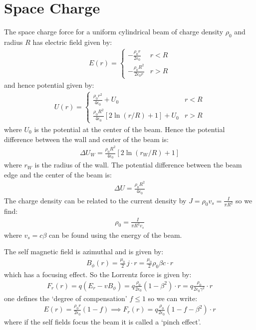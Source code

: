 \documentclass{article}
\numberwithin{equation}{section}
\begin{document}
\section{Space Charge}

The space charge force for a uniform cylindrical beam of charge density $\rho_0$ and radius $R$ has electric field given by:
\begin{align}
E(r) = \begin{cases}
-\frac{\rho_0 r}{2 \epsilon_0} & r<R \\
-\frac{\rho_0 R^2}{2 \epsilon_0 r} & r>R
\end{cases}
\end{align}
and hence potential given by:
\begin{align}
U(r) = \begin{cases}
\frac{\rho_0 r^2}{4 \epsilon_0} + U_0 & r<R \\
\frac{\rho_0 R^2}{4 \epsilon_0 } \left[ 2 \ln(r/R)+1 \right] + U_0 & r>R
\end{cases}
\end{align}
where $U_0$ is the potential at the center of the beam. Hence the potential difference between the wall and center of the beam is:
\begin{align}
\Delta U_W = \frac{\rho_0 R^2}{4 \epsilon_0 } \left[ 2 \ln(r_W/R)+1 \right] 
\end{align}
where $r_W$ is the radius of the wall. The potential difference between the beam edge and the center of the beam is:
\begin{align}
\Delta U = \frac{\rho_0 R^2}{4 \epsilon_0 } 
\end{align}
The charge density can be related to the current density by $J = \rho_0 v_s = \frac{I}{\pi R^2}$ so we find:
\begin{align}
\rho_0 = \frac{I}{\pi R^2 v_s}
\end{align}
where $v_s = c \beta$ can be found using the energy of the beam.

The self magnetic field is azimuthal and is given by:
\begin{align}
B_\phi(r) = \frac{\mu_0}{2}\, j \cdot r = \frac{\mu_0}{2}\rho_0 \beta c \cdot r
\end{align}
which has a focusing effect. So the Lorrentz force is given by:
\begin{align}
F_r(r) = q(E_r - vB_\phi) = q \frac{\rho_0}{2 \epsilon_0}(1-\beta^2 ) \cdot r = q \frac{\rho_0}{2 \epsilon_0 \gamma^2 } \cdot r 
\end{align}
one defines the `degree of compensation' $f \leq 1$ so we can write:
\begin{align}
E(r) = \frac{\rho_0 r}{2 \epsilon_0}(1-f) \implies F_r(r) = q \frac{\rho_0}{2\epsilon_0}(1-f-\beta^2)\cdot r 
\end{align}
where if the self fields focus the beam it is called a `pinch effect'.
\end{document}
